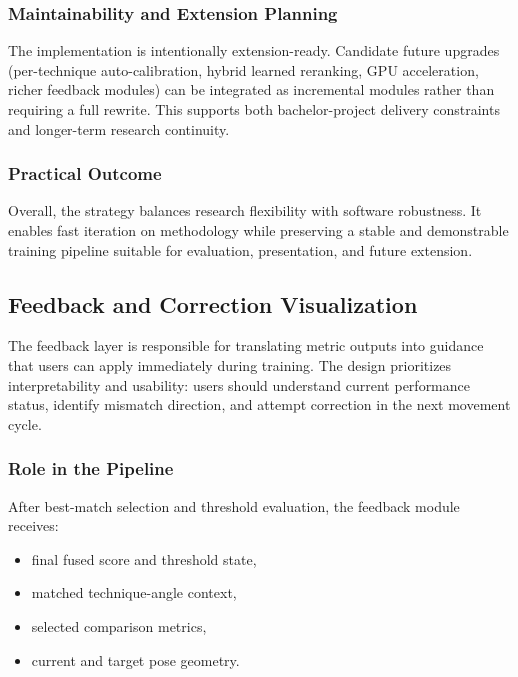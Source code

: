 \documentclass[12pt]{article}
\begin{document}
{\subsubsection{Maintainability and Extension Planning}

The implementation is intentionally extension-ready. Candidate future upgrades (per-technique auto-calibration, hybrid learned reranking, GPU acceleration, richer feedback modules) can be integrated as incremental modules rather than requiring a full rewrite. This supports both bachelor-project delivery constraints and longer-term research continuity.

\subsubsection{Practical Outcome}

Overall, the strategy balances research flexibility with software robustness. It enables fast iteration on methodology while preserving a stable and demonstrable training pipeline suitable for evaluation, presentation, and future extension.

\subsection{Feedback and Correction Visualization}

The feedback layer is responsible for translating metric outputs into guidance that users can apply immediately during training. The design prioritizes interpretability and usability: users should understand current performance status, identify mismatch direction, and attempt correction in the next movement cycle.

\subsubsection{Role in the Pipeline}

After best-match selection and threshold evaluation, the feedback module receives:

\begin{itemize}
    \item final fused score and threshold state,
    \item matched technique-angle context,
    \item selected comparison metrics,
    \item current and target pose geometry.
\end{itemize}

}
\end{document}
